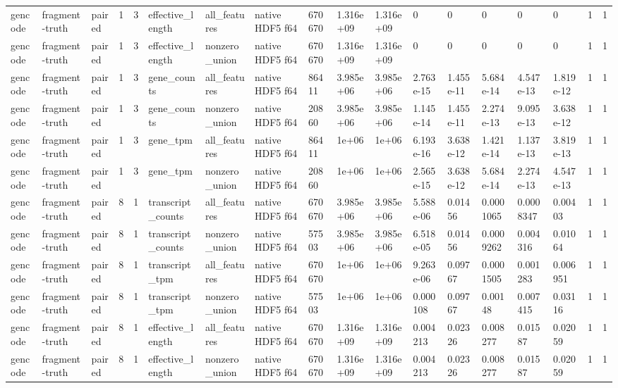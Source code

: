 \begin{tabular}{llllllllllllllllll}
gencode & fragment-truth & paired & 1 & 3 & effective\_length & all\_features & native HDF5 f64 & 670670 & 1.316e+09 & 1.316e+09 & 0 & 0 & 0 & 0 & 0 & 1 & 1 \\
gencode & fragment-truth & paired & 1 & 3 & effective\_length & nonzero\_union & native HDF5 f64 & 670670 & 1.316e+09 & 1.316e+09 & 0 & 0 & 0 & 0 & 0 & 1 & 1 \\
gencode & fragment-truth & paired & 1 & 3 & gene\_counts & all\_features & native HDF5 f64 & 86411 & 3.985e+06 & 3.985e+06 & 2.763e-15 & 1.455e-11 & 5.684e-14 & 4.547e-13 & 1.819e-12 & 1 & 1 \\
gencode & fragment-truth & paired & 1 & 3 & gene\_counts & nonzero\_union & native HDF5 f64 & 20860 & 3.985e+06 & 3.985e+06 & 1.145e-14 & 1.455e-11 & 2.274e-13 & 9.095e-13 & 3.638e-12 & 1 & 1 \\
gencode & fragment-truth & paired & 1 & 3 & gene\_tpm & all\_features & native HDF5 f64 & 86411 & 1e+06 & 1e+06 & 6.193e-16 & 3.638e-12 & 1.421e-14 & 1.137e-13 & 3.819e-13 & 1 & 1 \\
gencode & fragment-truth & paired & 1 & 3 & gene\_tpm & nonzero\_union & native HDF5 f64 & 20860 & 1e+06 & 1e+06 & 2.565e-15 & 3.638e-12 & 5.684e-14 & 2.274e-13 & 4.547e-13 & 1 & 1 \\
gencode & fragment-truth & paired & 8 & 1 & transcript\_counts & all\_features & native HDF5 f64 & 670670 & 3.985e+06 & 3.985e+06 & 5.588e-06 & 0.01456 & 0.0001065 & 0.0008347 & 0.00403 & 1 & 1 \\
gencode & fragment-truth & paired & 8 & 1 & transcript\_counts & nonzero\_union & native HDF5 f64 & 57503 & 3.985e+06 & 3.985e+06 & 6.518e-05 & 0.01456 & 0.0009262 & 0.004316 & 0.01064 & 1 & 1 \\
gencode & fragment-truth & paired & 8 & 1 & transcript\_tpm & all\_features & native HDF5 f64 & 670670 & 1e+06 & 1e+06 & 9.263e-06 & 0.09767 & 0.0001505 & 0.001283 & 0.006951 & 1 & 1 \\
gencode & fragment-truth & paired & 8 & 1 & transcript\_tpm & nonzero\_union & native HDF5 f64 & 57503 & 1e+06 & 1e+06 & 0.000108 & 0.09767 & 0.00148 & 0.007415 & 0.03116 & 1 & 1 \\
gencode & fragment-truth & paired & 8 & 1 & effective\_length & all\_features & native HDF5 f64 & 670670 & 1.316e+09 & 1.316e+09 & 0.004213 & 0.02326 & 0.008277 & 0.01587 & 0.02059 & 1 & 1 \\
gencode & fragment-truth & paired & 8 & 1 & effective\_length & nonzero\_union & native HDF5 f64 & 670670 & 1.316e+09 & 1.316e+09 & 0.004213 & 0.02326 & 0.008277 & 0.01587 & 0.02059 & 1 & 1 \\

\end{tabular}
